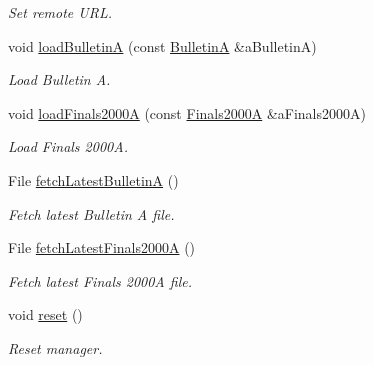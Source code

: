 \begin{DoxyCompactItemize}
\begin{DoxyCompactList}\small\item\em Set remote U\+RL. \end{DoxyCompactList}\item 
void \hyperlink{classostk_1_1physics_1_1coord_1_1frame_1_1provider_1_1iers_1_1_manager_a57d53edcf28bd7d02181384e9ea63dab}{load\+BulletinA} (const \hyperlink{classostk_1_1physics_1_1coord_1_1frame_1_1provider_1_1iers_1_1_bulletin_a}{BulletinA} \&a\+BulletinA)
\begin{DoxyCompactList}\small\item\em Load Bulletin A. \end{DoxyCompactList}\item 
void \hyperlink{classostk_1_1physics_1_1coord_1_1frame_1_1provider_1_1iers_1_1_manager_ad79ddb22cfd125d810840611c24a9f42}{load\+Finals2000A} (const \hyperlink{classostk_1_1physics_1_1coord_1_1frame_1_1provider_1_1iers_1_1_finals2000_a}{Finals2000A} \&a\+Finals2000A)
\begin{DoxyCompactList}\small\item\em Load Finals 2000A. \end{DoxyCompactList}\item 
File \hyperlink{classostk_1_1physics_1_1coord_1_1frame_1_1provider_1_1iers_1_1_manager_acb6883a9760e0809627ff695d2586176}{fetch\+Latest\+BulletinA} ()
\begin{DoxyCompactList}\small\item\em Fetch latest Bulletin A file. \end{DoxyCompactList}\item 
File \hyperlink{classostk_1_1physics_1_1coord_1_1frame_1_1provider_1_1iers_1_1_manager_ad0e823d55bb0db0d5547a4b4c8a571fa}{fetch\+Latest\+Finals2000A} ()
\begin{DoxyCompactList}\small\item\em Fetch latest Finals 2000A file. \end{DoxyCompactList}\item 
void \hyperlink{classostk_1_1physics_1_1coord_1_1frame_1_1provider_1_1iers_1_1_manager_ab43eacd0e4e55398731f1d1294c874bc}{reset} ()
\begin{DoxyCompactList}\small\item\em Reset manager. \end{DoxyCompactList}\end{DoxyCompactItemize}
